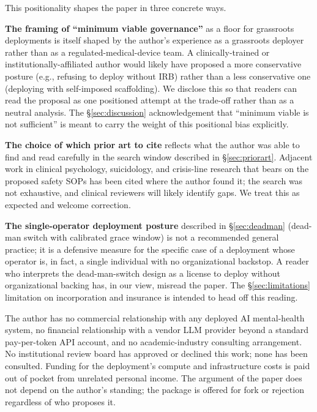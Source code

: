 \documentclass[letterpaper]{article} %
\begin{document}
This positionality shapes the paper in three concrete ways.

\noindent\textbf{The framing of ``minimum viable governance''} as a floor for grassroots deployments is itself shaped by the author's experience as a grassroots deployer rather than as a regulated-medical-device team. A clinically-trained or institutionally-affiliated author would likely have proposed a more conservative posture (e.g., refusing to deploy without IRB) rather than a less conservative one (deploying with self-imposed scaffolding). We disclose this so that readers can read the proposal as one positioned attempt at the trade-off rather than as a neutral analysis. The \S\ref{sec:discussion} acknowledgement that ``minimum viable is not sufficient'' is meant to carry the weight of this positional bias explicitly.

\noindent\textbf{The choice of which prior art to cite} reflects what the author was able to find and read carefully in the search window described in \S\ref{sec:priorart}. Adjacent work in clinical psychology, suicidology, and crisis-line research that bears on the proposed safety SOPs has been cited where the author found it; the search was not exhaustive, and clinical reviewers will likely identify gaps. We treat this as expected and welcome correction.

\noindent\textbf{The single-operator deployment posture} described in \S\ref{sec:deadman} (dead-man switch with calibrated grace window) is not a recommended general practice; it is a defensive measure for the specific case of a deployment whose operator is, in fact, a single individual with no organizational backstop. A reader who interprets the dead-man-switch design as a license to deploy without organizational backing has, in our view, misread the paper. The \S\ref{sec:limitations} limitation on incorporation and insurance is intended to head off this reading.

The author has no commercial relationship with any deployed AI mental-health system, no financial relationship with a vendor LLM provider beyond a standard pay-per-token API account, and no academic-industry consulting arrangement. No institutional review board has approved or declined this work; none has been consulted. Funding for the deployment's compute and infrastructure costs is paid out of pocket from unrelated personal income. The argument of the paper does not depend on the author's standing; the package is offered for fork or rejection regardless of who proposes it.
\end{document}
